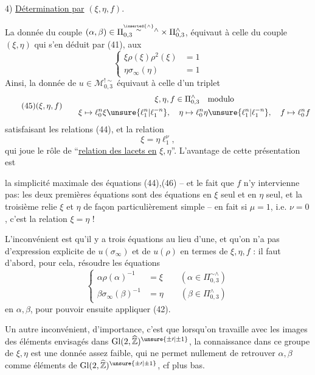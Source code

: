 4) \uline{Détermination par} $(\xi,\eta,f)$.

La donnée du couple $(\alpha,\beta)\in\Pi_{0,3}^{\overset{\inserted{\wedge}}{\sim}\wedge}\times\Pi_{0,3}^{\wedge}$, équivaut à celle du couple $(\xi,\eta)$ qui s'en déduit par (41),  aux 
\[
\tag{44}
\boxed{\left\{\begin{aligned}
\xi\rho(\xi)\rho^2(\xi)&=1\\
\eta\sigma_\infty(\eta)&=1
\end{aligned}\right.}
\]
Ainsi, la donnée de $u\in\mathcal{M}_{0,3}^{!\sim}$ équivaut à celle d'un triplet
\[
\tag{45}
(\xi,\eta,f)\qquad
\begin{gathered}
\xi,\eta,f\in\Pi_{0,3}^{\wedge}\quad\text{modulo}\\
\xi\mapsto\ell_0^n\xi\unsure{\ell_1^n|\ell_1^{-n}},\quad
\eta\mapsto\ell_0^n\eta\unsure{\ell_1^n|\ell_1^{-n}},\quad
f\mapsto\ell_0^n f
\end{gathered}
\]
satisfaisant les relations (44), et la relation
\[
\tag*{(46)=(43)}
\boxed{\xi=\eta\ell_1^\nu},
\]
qui joue le rôle de ``\uline{relation des lacets en} $\xi,\eta$''. L'avantage de cette présentation est


la simplicité maximale des équations (44),(46) -- et le fait que $f$ n'y intervienne pas:  les deux premières équations sont des équations en $\xi$ seul et en $\eta$ seul, et la troisième relie $\xi$ et $\eta$ de façon particulièrement simple -- en fait si $\mu=1$, i.e. $\nu=0$, c'est la relation $\xi=\eta$ !

L'inconvénient est qu'il y a trois équations au lieu d'une, et qu'on n'a pas d'expression explicite de $u(\sigma_\infty)$ et de $u(\rho)$ en termes de $\xi,\eta,f$ : il faut d'abord, pour cela, résoudre les équations
\[
\tag{47}
\left\{\begin{aligned}
\alpha\rho(\alpha)^{-1}&=\xi\qquad(\alpha\in\Pi_{0,3}^{\sim\wedge})\\
\beta\sigma_\infty(\beta)^{-1}&=\eta\qquad(\beta\in\Pi_{0,3}^{\wedge})
\end{aligned}\right.
\]
en $\alpha,\beta$, pour pouvoir ensuite appliquer (42).

Un autre \inserted{[!]} inconvénient, d'importance, c'est que lorsqu'on travaille avec les images des éléments envisagés dans $\mathrm{Gl}(2,\widehat{\mathbb Z})^{\unsure{\pm\prime|\pm1}}$, la connaissance dans ce groupe de $\xi,\eta$  est  une donnée assez faible, qui ne permet nullement de retrouver $\alpha,\beta$ comme éléments de $\mathrm{Gl}(2,\widehat{\mathbb Z})^{\unsure{\pm\prime|\pm1}}$, cf plus bas.

